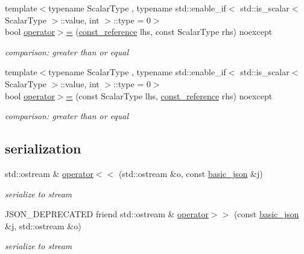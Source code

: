 \begin{DoxyCompactItemize}
{\footnotesize template$<$typename Scalar\+Type , typename std\+::enable\+\_\+if$<$ std\+::is\+\_\+scalar$<$ Scalar\+Type $>$\+::value, int $>$\+::type  = 0$>$ }\\bool \mbox{\hyperlink{classnlohmann_1_1basic__json_a68e3a92b3d9be1faa05c92d096299189}{operator$>$=}} (\mbox{\hyperlink{classnlohmann_1_1basic__json_a4057c5425f4faacfe39a8046871786ca}{const\+\_\+reference}} lhs, const Scalar\+Type rhs) noexcept
\begin{DoxyCompactList}\small\item\em comparison\+: greater than or equal \end{DoxyCompactList}\item 
{\footnotesize template$<$typename Scalar\+Type , typename std\+::enable\+\_\+if$<$ std\+::is\+\_\+scalar$<$ Scalar\+Type $>$\+::value, int $>$\+::type  = 0$>$ }\\bool \mbox{\hyperlink{classnlohmann_1_1basic__json_a5ee0e3e8afc7cbd932d6ed66418fa80a}{operator$>$=}} (const Scalar\+Type lhs, \mbox{\hyperlink{classnlohmann_1_1basic__json_a4057c5425f4faacfe39a8046871786ca}{const\+\_\+reference}} rhs) noexcept
\begin{DoxyCompactList}\small\item\em comparison\+: greater than or equal \end{DoxyCompactList}\end{DoxyCompactItemize}
\subsection*{serialization}
\begin{DoxyCompactItemize}
\item 
std\+::ostream \& \mbox{\hyperlink{classnlohmann_1_1basic__json_a5e34c5435e557d0bf666bd7311211405}{operator$<$$<$}} (std\+::ostream \&o, const \mbox{\hyperlink{classnlohmann_1_1basic__json}{basic\+\_\+json}} \&j)
\begin{DoxyCompactList}\small\item\em serialize to stream \end{DoxyCompactList}\item 
J\+S\+O\+N\+\_\+\+D\+E\+P\+R\+E\+C\+A\+T\+ED friend std\+::ostream \& \mbox{\hyperlink{classnlohmann_1_1basic__json_a9e06deabe69262c3ffc5533d32856983}{operator$>$$>$}} (const \mbox{\hyperlink{classnlohmann_1_1basic__json}{basic\+\_\+json}} \&j, std\+::ostream \&o)
\begin{DoxyCompactList}\small\item\em serialize to stream \end{DoxyCompactList}\end{DoxyCompactItemize}

